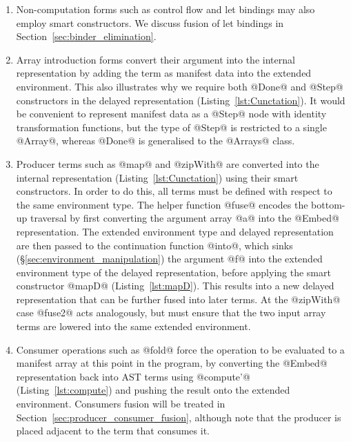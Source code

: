 \begin{enumerate}
\item Non-computation forms such as control flow and let bindings may also
    employ smart constructors. We discuss fusion of let bindings in
    Section~\ref{sec:binder_elimination}.

\item Array introduction forms convert their argument into the internal
    representation by adding the term as manifest data into the extended
    environment. This also illustrates why we require both @Done@ and @Step@
    constructors in the delayed representation (Listing~\ref{lst:Cunctation}).
    It would be convenient to represent manifest data as a @Step@ node with
    identity transformation functions, but the type of @Step@ is restricted to a
    single @Array@, whereas @Done@ is generalised to the @Arrays@ class.

\item Producer terms such as @map@ and @zipWith@ are converted into the internal
    representation (Listing~\ref{lst:Cunctation}) using their smart
    constructors. In order to do this, all terms must be defined with respect to
    the same environment type. The helper function @fuse@ encodes the bottom-up
    traversal by first converting the argument array @a@ into the @Embed@
    representation. The extended environment type and delayed representation are
    then passed to the continuation function @into@, which sinks
    (\S\ref{sec:environment_manipulation}) the argument @f@ into the extended
    environment type of the delayed representation, before applying the smart
    constructor @mapD@ (Listing~\ref{lst:mapD}). This results into a new delayed
    representation that can be further fused into later terms. At the @zipWith@
    case @fuse2@ acts analogously, but must ensure that the two input array
    terms are lowered into the same extended environment.

\item Consumer operations such as @fold@ force the operation to be evaluated to
    a manifest array at this point in the program, by converting the @Embed@
    representation back into AST terms using @compute'@
    (Listing~\ref{lst:compute}) and pushing the result onto the extended
    environment. Consumers fusion will be treated in
    Section~\ref{sec:producer_consumer_fusion}, although note that the producer
    is placed adjacent to the term that consumes it.

\end{enumerate}

